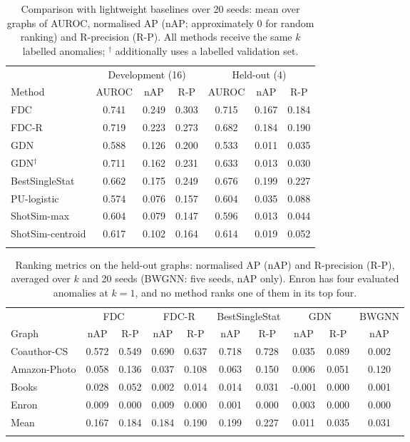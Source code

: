 \documentclass[pdflatex,sn-mathphys-ay]{sn-jnl}
\theoremstyle{plain}
\theoremstyle{remark}
\begin{document}
\begin{table}[!ht]
\caption{Comparison with lightweight baselines over 20 seeds: mean over graphs of AUROC, normalised AP (nAP; approximately 0 for random ranking) and R-precision (R-P). All methods receive the same $k$ labelled anomalies; $^{\dagger}$ additionally uses a labelled validation set.}
\label{tab:light}
\footnotesize
\begin{tabular*}{\textwidth}{@{\extracolsep{\fill}}lcccccc@{}}
\toprule
 & \multicolumn{3}{c}{Development (16)} & \multicolumn{3}{c}{Held-out (4)} \\
\cmidrule(lr){2-4}\cmidrule(l){5-7}
Method & AUROC & nAP & R-P & AUROC & nAP & R-P \\
\midrule
FDC & 0.741 & 0.249 & 0.303 & 0.715 & 0.167 & 0.184 \\
FDC-R & 0.719 & 0.223 & 0.273 & 0.682 & 0.184 & 0.190 \\
GDN & 0.588 & 0.126 & 0.200 & 0.533 & 0.011 & 0.035 \\
GDN$^{\dagger}$ & 0.711 & 0.162 & 0.231 & 0.633 & 0.013 & 0.030 \\
BestSingleStat & 0.662 & 0.175 & 0.249 & 0.676 & 0.199 & 0.227 \\
PU-logistic & 0.574 & 0.076 & 0.157 & 0.604 & 0.035 & 0.088 \\
ShotSim-max & 0.604 & 0.079 & 0.147 & 0.596 & 0.013 & 0.044 \\
ShotSim-centroid & 0.617 & 0.102 & 0.164 & 0.614 & 0.019 & 0.052 \\
\botrule
\end{tabular*}
\end{table}

\begin{table}[!ht]
\caption{Ranking metrics on the held-out graphs: normalised AP (nAP) and R-precision (R-P), averaged over $k$ and 20 seeds (BWGNN: five seeds, nAP only). Enron has four evaluated anomalies at $k=1$, and no method ranks one of them in its top four.}
\label{tab:heldoutmetrics}
\footnotesize
\setlength{\tabcolsep}{3pt}
\begin{tabular*}{\textwidth}{@{\extracolsep{\fill}}lccccccccc@{}}
\toprule
 & \multicolumn{2}{c}{FDC} & \multicolumn{2}{c}{FDC-R} & \multicolumn{2}{c}{BestSingleStat} & \multicolumn{2}{c}{GDN} & BWGNN \\
\cmidrule(lr){2-3}\cmidrule(lr){4-5}\cmidrule(lr){6-7}\cmidrule(lr){8-9}\cmidrule(l){10-10}
Graph & nAP & R-P & nAP & R-P & nAP & R-P & nAP & R-P & nAP \\
\midrule
Coauthor-CS & 0.572 & 0.549 & 0.690 & 0.637 & 0.718 & 0.728 & 0.035 & 0.089 & 0.002 \\
Amazon-Photo & 0.058 & 0.136 & 0.037 & 0.108 & 0.063 & 0.150 & 0.006 & 0.051 & 0.120 \\
Books & 0.028 & 0.052 & 0.002 & 0.014 & 0.014 & 0.031 & -0.001 & 0.000 & 0.001 \\
Enron & 0.009 & 0.000 & 0.009 & 0.000 & 0.001 & 0.000 & 0.003 & 0.000 & 0.000 \\
\midrule
Mean & 0.167 & 0.184 & 0.184 & 0.190 & 0.199 & 0.227 & 0.011 & 0.035 & 0.031 \\
\botrule
\end{tabular*}
\end{table}
\end{document}
